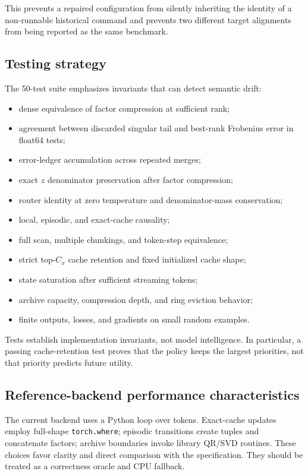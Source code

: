 This prevents a repaired configuration from silently inheriting the identity
of a non-runnable historical command and prevents two different target
alignments from being reported as the same benchmark.

\subsection{Testing strategy}
\label{sec:test-strategy}

The 50-test suite emphasizes invariants that can detect semantic drift:

\begin{itemize}
  \item dense equivalence of factor compression at sufficient rank;
  \item agreement between discarded singular tail and best-rank Frobenius
  error in float64 tests;
  \item error-ledger accumulation across repeated merges;
  \item exact \(z\) denominator preservation after factor compression;
  \item router identity at zero temperature and denominator-mass conservation;
  \item local, episodic, and exact-cache causality;
  \item full scan, multiple chunkings, and token-step equivalence;
  \item strict top-\(C_x\) cache retention and fixed initialized cache shape;
  \item state saturation after sufficient streaming tokens;
  \item archive capacity, compression depth, and ring eviction behavior;
  \item finite outputs, losses, and gradients on small random examples.
\end{itemize}

Tests establish implementation invariants, not model intelligence. In
particular, a passing cache-retention test proves that the policy keeps the
largest priorities, not that priority predicts future utility.

\subsection{Reference-backend performance characteristics}

The current backend uses a Python loop over tokens. Exact-cache updates employ
full-shape \texttt{torch.where}; episodic transitions create tuples and
concatenate factors; archive boundaries invoke library QR/SVD routines. These
choices favor clarity and direct comparison with the specification. They
should be treated as a correctness oracle and CPU fallback.

